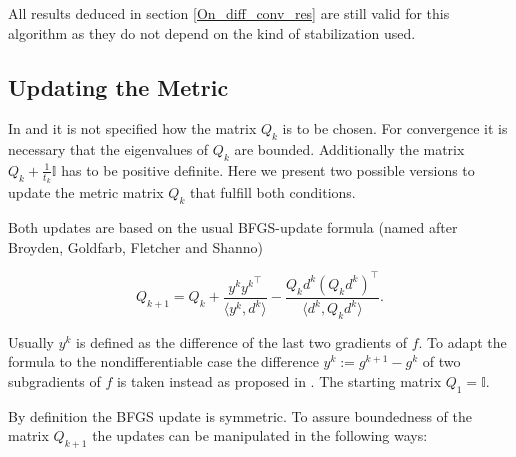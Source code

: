 \begin{remark}
	All results deduced in section \ref{On_diff_conv_res} are still valid for this algorithm as they do not depend on the kind of stabilization used.
\end{remark}

\subsection{Updating the Metric}
\label{sec_upd_Q}



In \cite{Noll2012} and \cite{Noll2013} it is not specified how the matrix \(Q_k\) is to be chosen.
For convergence it is necessary that the eigenvalues of \(Q_k\) are bounded. Additionally the matrix \(Q_k+\frac{1}{t_k}\mathbb{I}\) has to be positive definite.
Here we present two possible versions to update the metric matrix \(Q_k\) that fulfill both conditions.

Both updates are based on the usual BFGS-update formula (named after Broyden, Goldfarb, Fletcher and Shanno)

\begin{equation}
	Q_{k+1} = Q_k + \frac{y^k{y^k}^{\top}}{\langle y^k,d^k\rangle}-\frac{Q_kd^k(Q_kd^k)^{\top}}{\langle d^k,Q_kd^k \rangle}.
	\label{BFGS_update}
\end{equation}

Usually \(y^k\) is defined as the difference of the last two gradients of \(f\). To adapt the formula to the nondifferentiable case the difference \(y^k := g^{k+1}-g^k\) of two subgradients of \(f\) is taken instead as proposed in \cite{Haarala2007}.
The starting matrix \(Q_1 = \mathbb{I}\).


By definition the BFGS update is symmetric. To assure boundedness of the matrix \(Q_{k+1}\) the updates can be manipulated in the following ways:

